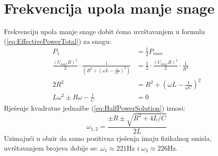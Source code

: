 \documentclass{article}
\let\oldref\ref
\renewcommand{\ref}[1]{(\oldref{#1})}
\begin{document}
\section*{Frekvencija upola manje snage}
Frekvenciju upola manje snage dobit ćemo uvrštavanjem u formulu \ref{eq:EffectivePowerTotal} za snagu:
\begin{align}
  P_{1}                                                                                                  & = \frac{1}{2}P_{max}                                                      \\
  \frac{\left(U_{max}R\right)^2}{2} \cdot \frac{1}{\left(R^2 + (\omega L - \frac{1}{\omega C})^2\right)} & = \frac{1}{2} \cdot \frac{\left(U_{max}R\right)^2}{2} \cdot \frac{1}{R^2} \\
  2R^2                                                                                                   & = R^2 + \left(\omega L - \frac{1}{\omega C}\right)^2                      \\
  \label{eq:HalfPowerSolution}
  L\omega^2 \pm R\omega - \frac{1}{C}                                                                    & = 0
\end{align}
Rješenje kvadratne jednažbe \ref{eq:HalfPowerSolution} iznosi:
\begin{equation}
  \omega_{1,2} = \frac{\pm R \pm \sqrt{R^2 + 4L/C}}{2L}
\end{equation}
Uzimajući u obzir da samo pozitivna rješenja imaju fizikalnog smisla, uvrštavanjem brojeva dobije se: $\omega_1 \approx 221\text{Hz}$ i $\omega_2 \approx 226\text{Hz}$.
\end{document}
